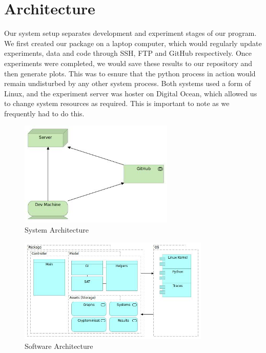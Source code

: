 \section[Architecture]{Architecture}
Our system setup separates development and experiment stages of our program. We first created our package on a laptop computer, which would regularly update experiments, data and code through SSH, FTP and GitHub respectively. Once experiments were completed, we would save these results to our repository and then generate plots. This was to esnure that the python process in action would remain undisturbed by any other system process. Both systems used a form of Linux, and the experiment server was hoster on Digital Ocean, which allowed us to change system resources as required. This is important to note as we frequently had to do this.
\par
\begin{figure}[htbp!]
	\begin{center}
		\leavevmode
		\includegraphics[height=50mm]{Figs/architecture.jpg}
	\end{center}
	\caption{System Architecture}
	\label{fig:one}
\end{figure}
\begin{figure}[htbp!]
	\begin{center}
		\leavevmode
		\includegraphics[height=50mm]{Figs/implementation-architecture.jpg}
	\end{center}
	\caption{Software Architecture}
	\label{fig:one}
\end{figure}

